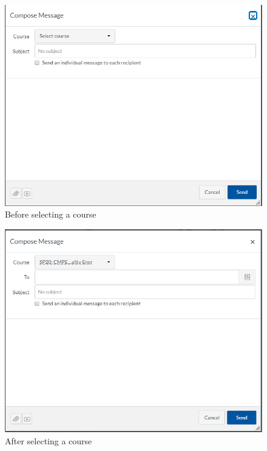 \documentclass[10pt,letterpaper]{article}
\begin{document}
\begin{figure}[h!]
	\centerline{\includegraphics[width=12cm]{screenshots/compose-message-before-selecting-course.png}}
	\caption{Before selecting a course}
\end{figure}
\begin{figure}[h!]
	\centerline{\includegraphics[width=12cm]{screenshots/compose-message-after-selecting-course.png}}
	\caption{After selecting a course}
\end{figure}
\end{document}
